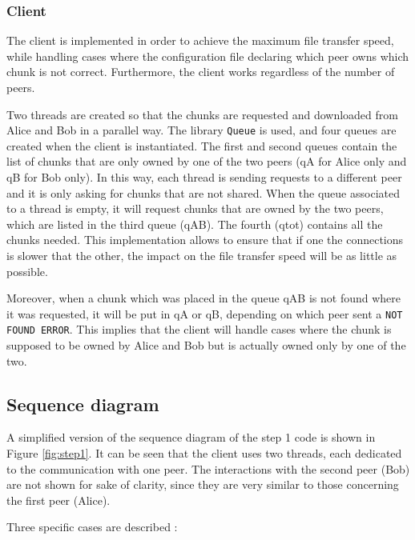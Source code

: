 \subsubsection{Client}

The client is implemented in order to achieve the maximum file transfer speed, while handling cases where the configuration file declaring which peer owns which chunk is not correct. Furthermore, the client works regardless of the number of peers.

Two threads are created so that the chunks are requested and downloaded from Alice and Bob in a parallel way. The library \texttt{Queue} is used, and four queues are created when the client is instantiated. The first and second queues contain the list of chunks that are only owned by one of the two peers (qA for Alice only and qB for Bob only). In this way, each thread is sending requests to a different peer and it is only asking for chunks that are not shared. When the queue associated to a thread is empty, it will request chunks that are owned by the two peers, which are listed in the third queue (qAB). The fourth (qtot) contains all the chunks needed. This implementation allows to ensure that if one the connections is slower that the other, the impact on the file transfer speed will be as little as possible.

Moreover, when a chunk which was placed in the queue qAB is not found where it was requested, it will be put in qA or qB, depending on which peer sent a \texttt{NOT FOUND ERROR}. This implies that the client will handle cases where the chunk is supposed to be owned by Alice and Bob but is actually owned only by one of the two.

\subsection{Sequence diagram}

A simplified version of the sequence diagram of the step 1 code is shown in Figure \ref{fig:step1}. It can be seen that the client uses two threads, each dedicated to the communication with one peer. The interactions with the second peer (Bob) are not shown for sake of clarity, since they are very similar to those concerning the first peer (Alice).

Three specific cases are described : 


